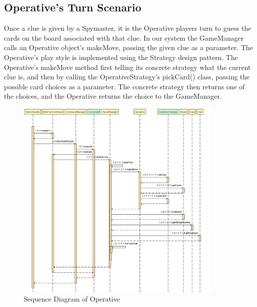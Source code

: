 \subsection{Operative's Turn Scenario}
Once a clue is given by a Spymaster, it is the Operative players turn to guess the cards on the board associated with that clue. In our system the GameManager calls an Operative object's makeMove, passing the given clue as a parameter. The Operative's play style is implemented using the Strategy design pattern. The Operative's makeMove method first telling its concrete strategy what the current clue is, and then by calling the OperativeStrategy's pickCard() class, passing the possible card choices as a parameter. The concrete strategy then returns one of the choices, and the Operative returns the choice to the GameManager.

\begin{figure}[H]
\centering
\includegraphics[width=10cm]{Source/DynamicDesign/Scenario/Operative.png}
\caption{Sequence Diagram of Operative}
\end{figure}
